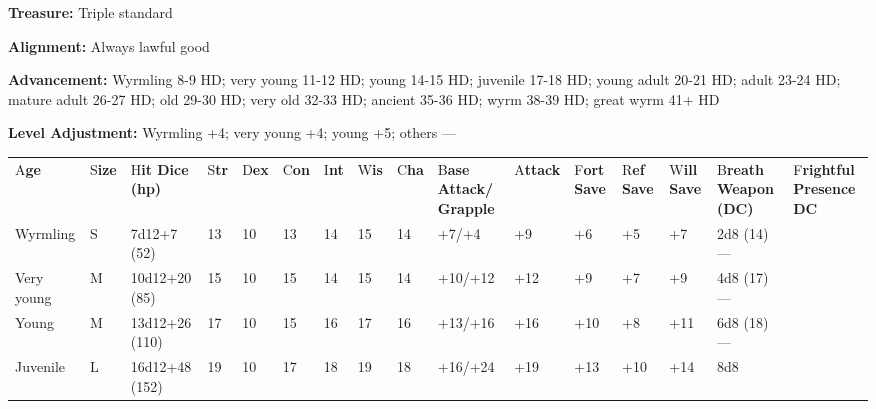 \documentclass{article}
\begin{document}
{\textbf{Treasure:} Triple standard

\textbf{Alignment:} Always lawful good

\textbf{Advancement:} Wyrmling 8-9 HD; very young 11-12 HD; young 14-15 HD; juvenile 
17-18 HD; young adult 20-21 HD; adult 23-24 HD; mature adult 26-27 HD; old 29-30 
HD; very old 32-33 HD; ancient 35-36 HD; wyrm 38-39 HD; great wyrm 41+ HD

\textbf{Level Adjustment:} Wyrmling +4; very young +4; young +5; others ---

\vspace{12pt}
\begin{tabular}{|>{\raggedright}p{18pt}|>{\raggedright}p{6pt}|>{\raggedright}p{18pt}|>{\raggedright}p{4pt}|>{\raggedright}p{5pt}|>{\raggedright}p{6pt}|>{\raggedright}p{4pt}|>{\raggedright}p{5pt}|>{\raggedright}p{6pt}|>{\raggedright}p{14pt}|>{\raggedright}p{10pt}|>{\raggedright}p{8pt}|>{\raggedright}p{8pt}|>{\raggedright}p{8pt}|>{\raggedright}p{16pt}|>{\raggedright}p{17pt}|}
\hline
\multicolumn{16}{|p{158pt}|}{S\textbf{ilver Dragons by Age}}\tabularnewline
\hline
A{\small{}\textbf{ge}} & S{\small{}\textbf{ize}} & H{\small{}\textbf{it Dice (hp)}} & S{\small{}\textbf{tr}} & D{\small{}\textbf{ex}} & C{\small{}\textbf{on}} & I{\small{}\textbf{nt}} & W{\small{}\textbf{is}} & C{\small{}\textbf{ha}} & B{\small{}\textbf{ase 
Attack/}}\linebreak{}
{\small{}\textbf{Grapple}} & A{\small{}\textbf{ttack}} & F{\small{}\textbf{ort 
Save}} & R{\small{}\textbf{ef Save}} & W{\small{}\textbf{ill Save}} & B{\small{}\textbf{reath 
Weapon (DC)}} & F{\small{}\textbf{rightful Presence DC}}\tabularnewline
\hline
W{\small{}yrmling} & S & 7{\small{}d12+7 (52)} & 1{\small{}3} & 1{\small{}0} & 1{\small{}3} & 1{\small{}4} & 1{\small{}5} & 1{\small{}4} & +{\small{}7/+4} & +{\small{}9} & +{\small{}6} & +{\small{}5} & +{\small{}7} & 2{\small{}d8 
(14)}--- & \tabularnewline
\hline
V{\small{}ery young} & M & 1{\small{}0d12+20 (85)} & 1{\small{}5} & 1{\small{}0} & 1{\small{}5} & 1{\small{}4} & 1{\small{}5} & 1{\small{}4} & +{\small{}10/+12} & +{\small{}12} & +{\small{}9} & +{\small{}7} & +{\small{}9} & 4{\small{}d8 
(17)}--- & \tabularnewline
\hline
Y{\small{}oung} & M & 1{\small{}3d12+26 (110)} & 1{\small{}7} & 1{\small{}0} & 1{\small{}5} & 1{\small{}6} & 1{\small{}7} & 1{\small{}6} & +{\small{}13/+16} & +{\small{}16} & +{\small{}10} & +{\small{}8} & +{\small{}11} & 6{\small{}d8 
(18)}--- & \tabularnewline
\hline
J{\small{}uvenile} & L & 1{\small{}6d12+48 (152)} & 1{\small{}9} & 1{\small{}0} & 1{\small{}7} & 1{\small{}8} & 1{\small{}9} & 1{\small{}8} & +{\small{}16/+24} & +{\small{}19} & +{\small{}13} & +{\small{}10} & +{\small{}14} & 8{\small{}d8 
}
\end{tabular}}
\end{document}
